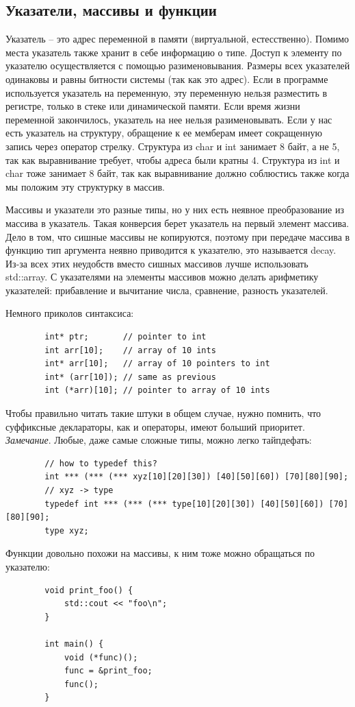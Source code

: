 \documentclass[12pt, a4paper]{article}
\begin{document}
	\subsection{Указатели, массивы и функции}
	Указатель -- это адрес переменной в памяти (виртуальной, естесственно). Помимо места указатель также хранит в себе информацию о типе. Доступ к элементу по указателю осуществляется с помощью разименовывания. Размеры всех указателей одинаковы и равны битности системы (так как это адрес). Если в программе используется указатель на переменную, эту переменную нельзя разместить в регистре, только в стеке или динамической памяти. Если время жизни переменной закончилось, указатель на нее нельзя разименовывать. Если у нас есть указатель на структуру, обращение к ее мемберам имеет сокращенную запись через оператор стрелку. Структура из char и int занимает 8 байт, а не 5, так как выравнивание требует, чтобы адреса были кратны 4. Структура из int и char тоже занимает 8 байт, так как выравнивание должно соблюстись также когда мы положим эту структурку в массив.
	\\\par Массивы и указатели это разные типы, но у них есть неявное преобразование из массива в указатель. Такая конверсия берет указатель на первый элемент массива. Дело в том, что сишные массивы не копируются, поэтому при передаче массива в функцию тип аргумента неявно приводится к указателю, это называется decay. Из-за всех этих неудобств вместо сишных массивов лучше использовать std::array. С указателями на элементы массивов можно делать арифметику указателей: прибавление и вычитание числа, сравнение, разность указателей.
	\\\par Немного приколов синтаксиса:
	\begin{verbatim}
		int* ptr;       // pointer to int
		int arr[10];    // array of 10 ints
		int* arr[10];   // array of 10 pointers to int
		int* (arr[10]); // same as previous
		int (*arr)[10]; // pointer to array of 10 ints
	\end{verbatim}
	Чтобы правильно читать такие штуки в общем случае, нужно помнить, что суффиксные деклараторы, как и операторы, имеют больший приоритет.
	\\\textit{Замечание}. Любые, даже самые сложные типы, можно легко тайпдефать:
	\begin{verbatim}
		// how to typedef this?
		int *** (*** (*** xyz[10][20][30]) [40][50][60]) [70][80][90];
		// xyz -> type
		typedef int *** (*** (*** type[10][20][30]) [40][50][60]) [70][80][90];
		type xyz;
	\end{verbatim}
	\par Функции довольно похожи на массивы, к ним тоже можно обращаться по указателю:
	\begin{verbatim}
		void print_foo() {
		    std::cout << "foo\n";
		}
		
		int main() {
			void (*func)();
			func = &print_foo;
			func();
		}
	\end{verbatim}
\end{document}
